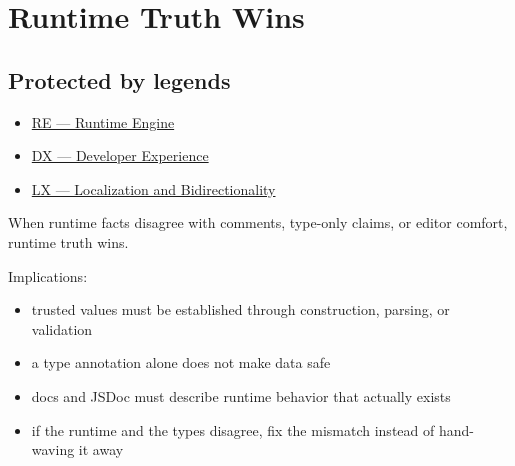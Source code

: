 \chapter{Runtime Truth Wins}\label{record-055}

\smallskip

\section{Protected by legends}\label{record-055-protected-by-legends}

\begin{itemize}
\tightlist
\item
  \href{https://github.com/flyingrobots/bijou/blob/1853ad902f6bf219326409e7f743a5a1d6517dbc/docs/legends/RE-runtime-engine.md}{RE --- Runtime Engine}
\item
  \href{https://github.com/flyingrobots/bijou/blob/1853ad902f6bf219326409e7f743a5a1d6517dbc/docs/legends/DX-developer-experience.md}{DX --- Developer Experience}
\item
  \href{https://github.com/flyingrobots/bijou/blob/1853ad902f6bf219326409e7f743a5a1d6517dbc/docs/legends/LX-localization-and-bidirectionality.md}{LX --- Localization and Bidirectionality}
\end{itemize}

When runtime facts disagree with comments, type-only claims, or editor comfort, runtime truth wins.

Implications:

\begin{itemize}
\tightlist
\item
  trusted values must be established through construction, parsing, or validation
\item
  a type annotation alone does not make data safe
\item
  docs and JSDoc must describe runtime behavior that actually exists
\item
  if the runtime and the types disagree, fix the mismatch instead of hand-waving it away
\end{itemize}

